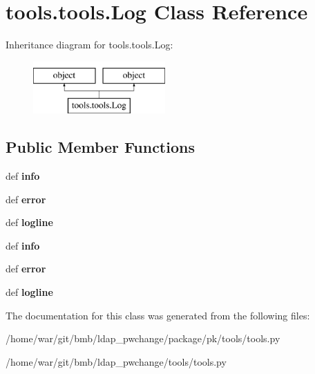 \hypertarget{classtools_1_1tools_1_1Log}{\section{tools.\-tools.\-Log Class Reference}
\label{classtools_1_1tools_1_1Log}
}
Inheritance diagram for tools.\-tools.\-Log\-:\begin{figure}[H]
\begin{center}
\leavevmode
\includegraphics[height=2.000000cm]{classtools_1_1tools_1_1Log}
\end{center}
\end{figure}
\subsection*{Public Member Functions}
\begin{DoxyCompactItemize}
\item 
\hypertarget{classtools_1_1tools_1_1Log_aa3e3c9747b57d6d63cf96bc03e9cb9e3}{def {\bfseries info}}\label{classtools_1_1tools_1_1Log_aa3e3c9747b57d6d63cf96bc03e9cb9e3}

\item 
\hypertarget{classtools_1_1tools_1_1Log_a4ae4854363b96eb14b7827cb2fac1c84}{def {\bfseries error}}\label{classtools_1_1tools_1_1Log_a4ae4854363b96eb14b7827cb2fac1c84}

\item 
\hypertarget{classtools_1_1tools_1_1Log_ae7972688c982cd7f4727084e5856912b}{def {\bfseries logline}}\label{classtools_1_1tools_1_1Log_ae7972688c982cd7f4727084e5856912b}

\item 
\hypertarget{classtools_1_1tools_1_1Log_aa3e3c9747b57d6d63cf96bc03e9cb9e3}{def {\bfseries info}}\label{classtools_1_1tools_1_1Log_aa3e3c9747b57d6d63cf96bc03e9cb9e3}

\item 
\hypertarget{classtools_1_1tools_1_1Log_a4ae4854363b96eb14b7827cb2fac1c84}{def {\bfseries error}}\label{classtools_1_1tools_1_1Log_a4ae4854363b96eb14b7827cb2fac1c84}

\item 
\hypertarget{classtools_1_1tools_1_1Log_ae7972688c982cd7f4727084e5856912b}{def {\bfseries logline}}\label{classtools_1_1tools_1_1Log_ae7972688c982cd7f4727084e5856912b}

\end{DoxyCompactItemize}


The documentation for this class was generated from the following files\-:\begin{DoxyCompactItemize}
\item 
/home/war/git/bmb/ldap\-\_\-pwchange/package/pk/tools/tools.\-py\item 
/home/war/git/bmb/ldap\-\_\-pwchange/tools/tools.\-py\end{DoxyCompactItemize}
